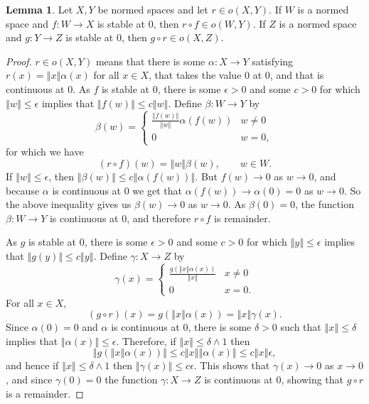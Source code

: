 \documentclass{article}
\newcommand{\norm}[1]{\left\Vert #1 \right\Vert}
\theoremstyle{definition}
\newtheorem{lemma}[theorem]{Lemma}
\theoremstyle{definition}
\begin{document}
\begin{lemma}
Let $X,Y$ be normed spaces and let $r \in o(X,Y)$. 
If $W$ is a normed space and $f:W \to X$ is stable at 0, then $r \circ f \in o(W,Y)$. If $Z$ is a normed space
and $g:Y \to Z$ is stable at 0, then $g \circ r \in o(X,Z)$.
 \label{stable}
\end{lemma}
\begin{proof}
$r \in o(X,Y)$ means that there is some $\alpha:X \to Y$ satisfying  $r(x)=\norm{x}\alpha(x)$ for all
$x \in X$, that takes the value $0$ at $0$, and that is continuous at $0$.
As $f$ is stable at $0$, there is some $\epsilon>0$ and some $c>0$ for which $\norm{w} \leq \epsilon$ implies that
$\norm{f(w)} \leq c \norm{w}$. 
Define $\beta:W \to Y$ by
\[
\beta(w)=\begin{cases}
\frac{\norm{f(w)}}{\norm{w}} \alpha(f(w))&w \neq 0\\
0&w=0,
\end{cases}
\]
for which we have
\[
(r \circ f)(w)=\norm{w}\beta(w), \qquad w \in W.
\]
If 
$\norm{w} \leq \epsilon$, then
$\norm{\beta(w)} \leq c \norm{\alpha(f(w))}$.
But $f(w) \to 0$ as $w \to 0$, and
 because $\alpha$ is continuous at $0$ we get that $\alpha(f(w)) \to \alpha(0)=0$ as $w \to 0$.
So the above inequality gives us $\beta(w) \to 0$ as $w \to 0$. As  $\beta(0)=0$, the function $\beta:W \to Y$ is continuous at $0$, and therefore
 $r \circ f$ is remainder.


As $g$ is stable at $0$, there is some $\epsilon>0$ and some $c>0$ for which $\norm{y} \leq \epsilon$ implies that
$\norm{g(y)} \leq c \norm{y}$. 
Define $\gamma:X \to Z$ by
\[
\gamma(x)
=\begin{cases}
\frac{g(\norm{x}\alpha(x))}{\norm{x}}&x \neq 0\\
0&x=0.
\end{cases}
\]
For all $x \in X$,
\[
(g \circ r)(x) = g(\norm{x}\alpha(x)) = \norm{x} \gamma(x).
\]
Since $\alpha(0) = 0$ and $\alpha$ is continuous at $0$, there is some $\delta>0$ such that
$\norm{x} \leq \delta$ implies that $\norm{\alpha(x)} \leq \epsilon$. Therefore, if
$\norm{x} \leq \delta \wedge 1$ then
\[
\norm{g(\norm{x}\alpha(x))} \leq c \norm{x} \norm{\alpha(x)} \leq c \norm{x} \epsilon,
\]
and hence if $\norm{x} \leq \delta \wedge 1$ then $\norm{\gamma(x)} \leq c\epsilon$. This shows that
$\gamma(x) \to 0$ as $x \to 0$, and since $\gamma(0)=0$  the function $\gamma:X \to Z$ is continuous at $0$, showing that $g \circ r$ is a remainder.
\end{proof}
\end{document}
